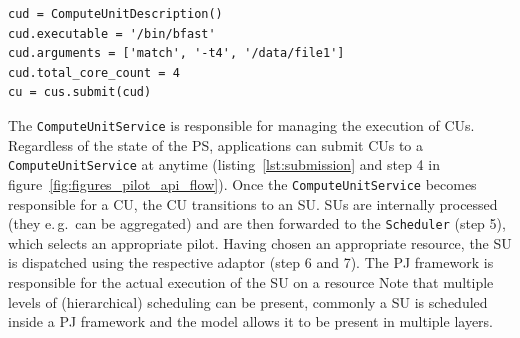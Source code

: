\documentclass[conference,final]{IEEEtran}
\newcommand{\cu}{CU\xspace}
\newcommand{\cus}{CUs\xspace}
\begin{document}
\noindent\begin{minipage}{0.47 \textwidth}
\begin{lstlisting}[caption={\textbf{ComputeUnit Submission:} Instantiation and 
	submission of a \texttt{ComputeUnitDescription}.}, label={lst:submission}] 
cud = ComputeUnitDescription()
cud.executable = '/bin/bfast'
cud.arguments = ['match', '-t4', '/data/file1']
cud.total_core_count = 4
cu = cus.submit(cud)
\end{lstlisting}
\end{minipage}


The \texttt{ComputeUnitService} is responsible for managing the execution of \cus.
Regardless of the state of the PS, applications can submit \cus to a
\texttt{ComputeUnitService} at anytime (listing~\ref{lst:submission} and step 4 in
figure~\ref{fig:figures_pilot_api_flow}). Once the \texttt{ComputeUnitService} becomes
responsible for a \cu, the \cu  transitions to an SU. SUs are internally processed
(they e.\,g.\ can be aggregated) and are then forwarded to the
\texttt{Scheduler} (step 5), which selects an appropriate pilot. Having chosen
an appropriate resource, the SU is dispatched using the respective adaptor (step
6 and 7). The PJ framework is responsible for the actual execution of the SU on
a resource
Note that multiple levels of (hierarchical) scheduling can be
present, commonly a SU is scheduled inside a PJ framework and the model allows
it to be present in multiple layers.



\end{document}
